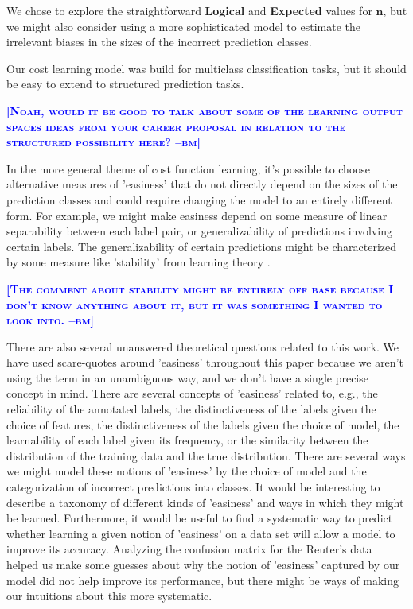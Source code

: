 \documentclass{article} %
\newcommand{\bmcomment}[1]{\textcolor{blue}{\textsc{\textbf{[#1 --bm]}}}}
\begin{document}
We chose to explore the straightforward \textbf{Logical} 
and \textbf{Expected} values for $\mathbf{n}$, but we might 
also consider using a more sophisticated model to estimate the 
irrelevant biases in the sizes of the incorrect prediction 
classes.

Our cost learning model was build for multiclass classification
tasks, but it should be easy to extend to structured prediction
tasks.

\bmcomment{Noah, would it be good to talk about some of the
learning output spaces ideas from your career proposal in 
relation to the structured possibility here?}

In the more general theme of cost function learning, it's possible
to choose alternative measures of 'easiness' that do not directly
depend on the sizes of the prediction classes and could require
changing the model to an entirely different form.  For example,
we might make easiness depend on some measure of linear separability
between each label pair, or generalizability of predictions involving
certain labels. The generalizability of certain predictions might 
be characterized by some measure like 'stability' from learning 
theory \citep{mukherjee2006learning}.

\bmcomment{The comment about stability might be entirely off base
because I don't know anything about it, but it was something
I wanted to look into.}

There are also several unanswered theoretical questions related 
to this work.  We have used scare-quotes around 'easiness' throughout
this paper because we aren't using the term in an unambiguous way,
and we don't have a single precise concept in mind.  There are
several concepts of 'easiness' related to, e.g., the reliability 
of the annotated labels, the distinctiveness of the labels given the 
choice of features, the distinctiveness of the labels given
the choice of model, the learnability of each label given its
frequency, or the similarity between the distribution of the
training data and the true distribution. There are several ways we 
might model these notions of 'easiness' by the choice of 
model and the categorization of incorrect predictions into classes.
It would be interesting to describe a taxonomy of different kinds
of 'easiness' and ways in which they might be learned.  Furthermore,
it would be useful to find a systematic way to predict whether 
learning a given notion of 'easiness' on a data set will allow a model 
to improve its accuracy.  Analyzing the confusion matrix for the
Reuter's data helped us make some guesses about why the notion of 'easiness' 
captured by our model did not help improve its performance, but
there might be ways of making our intuitions about this more systematic.
\end{document}
